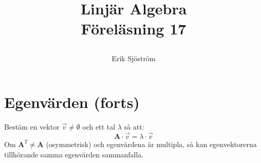

\title{
	 Linjär Algebra\\
	 Föreläsning 17 
    \author{Erik Sjöström}
}

\maketitle

\section{Egenvärden (forts)} %
\label{sec:egenv_rden}
Bestäm en vektor $\vec{v} \neq \emptyset$ och ett tal $\lambda$ så att:
\[
\mathbf{A} \cdot \vec{v} = \lambda \cdot \vec{v}
\]
Om $\mathbf{A}^{T} \neq \mathbf{A}$ (osymmetrisk) och egenvärdena är multipla, så kan egenvektorerna tillhörande samma egenvärden sammanfalla.
